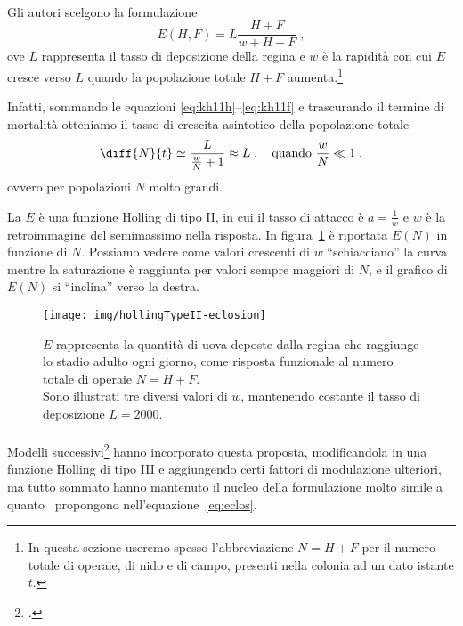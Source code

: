 \paragraph{}
Gli autori scelgono la formulazione
\begin{equation}
    \label{eq:eclos}
    E(H,F) = L \frac{H+F}{w + H + F} \; ,
\end{equation}
ove $L$ rappresenta il tasso di deposizione della regina e $w$ è la rapidità con cui $E$ cresce verso $L$ quando
la popolazione totale $H+F$ aumenta.\footnote{In questa sezione useremo spesso l'abbreviazione
$N=H+F$ per il numero totale di operaie, di nido e di campo, presenti nella colonia ad un dato istante $t$.}

Infatti, sommando le equazioni \eqref{eq:kh11h}--\eqref{eq:kh11f} e trascurando il termine di mortalità otteniamo
il tasso di crescita asintotico della popolazione totale
$$\diff{N}{t} \simeq \frac{L}{ \frac{w}{N} + 1} \approx L \; , \quad \text{quando } \frac{w}{N} \ll 1 \; ,$$
ovvero per popolazioni $N$ molto grandi.

La $E$ è una funzione Holling di tipo II, in cui il tasso di attacco è $a=\frac{1}{w}$ e $w$
è la retroimmagine del semimassimo nella risposta. In figura~\ref{img:eclos} è riportata $E(N)$ in funzione di $N$.
Possiamo vedere come valori
crescenti di $w$ ``schiacciano'' la curva mentre la saturazione è raggiunta per valori sempre maggiori di $N$,
e il grafico di $E(N)$ si ``inclina'' verso la destra.
\begin{figure}[!hb]
    \centering
    \texttt{[image: img/hollingTypeII-eclosion]}

    \caption[Schiusa, Holling tipo II]{$E$ rappresenta la quantità di uova deposte dalla regina che raggiunge lo
    stadio adulto ogni giorno, come risposta funzionale al numero totale di operaie $N=H+F$.
    \\
    Sono illustrati tre diversi valori di $w$, mantenendo costante il tasso di deposizione $L=2000$.}
    \label{img:eclos}
\end{figure}

\paragraph{}
Modelli successivi\footcite{ratti2017} hanno incorporato questa proposta, modificandola in una funzione Holling
di tipo III e aggiungendo certi fattori di modulazione ulteriori, ma tutto sommato hanno mantenuto il nucleo
della formulazione molto simile a quanto~\citeauthor{khoury2011} propongono nell'equazione~\eqref{eq:eclos}.


